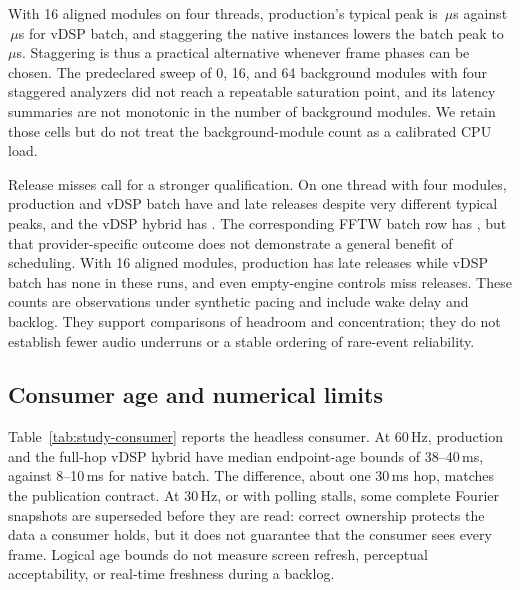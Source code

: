 



With 16 aligned modules on four threads, production's typical peak is
\StudyHostManyCorePeak\,$\mu$s against \StudyHostManyBatchPeak\,$\mu$s for
vDSP batch, and staggering the native instances lowers the batch peak to
\StudyHostStaggerBatchPeak\,$\mu$s. Staggering is thus a practical
alternative whenever frame phases can be chosen. The predeclared sweep of 0,
16, and 64 background modules with four staggered analyzers did not reach a
repeatable saturation point, and its latency summaries are not monotonic in
the number of background modules. We retain those cells but do not treat the
background-module count as a calibrated CPU load.

Release misses call for a stronger qualification. On one thread with four
modules, production and vDSP batch have \StudyHostCoreMisses{} and
\StudyHostBatchMisses{} late releases despite very different typical peaks,
and the vDSP hybrid has \StudyHostHybridMisses. The corresponding FFTW batch
row has \StudyHostFftwBatchMisses, but that provider-specific outcome does not
demonstrate a general benefit of scheduling. With 16 aligned modules,
production has \StudyHostManyCoreMisses{} late releases while vDSP batch has
none in these runs, and even empty-engine controls miss releases. These counts
are observations under synthetic pacing and include wake delay and backlog.
They support comparisons of headroom and concentration; they do not establish
fewer audio underruns or a stable ordering of rare-event reliability.

\subsection{Consumer age and numerical limits}
Table~\ref{tab:study-consumer} reports the headless consumer. At 60\,Hz,
production and the full-hop vDSP hybrid have median endpoint-age bounds of
38--40\,ms, against 8--10\,ms for native batch. The difference, about one
30\,ms hop, matches the publication contract. At 30\,Hz, or with polling
stalls, some complete Fourier snapshots are superseded before they are read:
correct ownership protects the data a consumer holds, but it does not
guarantee that the consumer sees every frame. Logical age bounds do not
measure screen refresh, perceptual acceptability, or real-time freshness
during a backlog.



